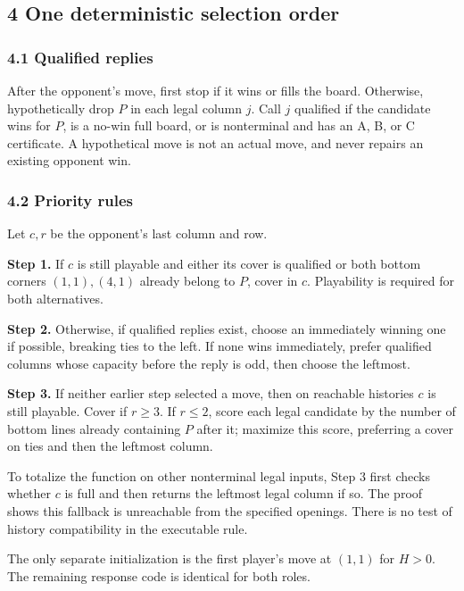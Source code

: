 \documentclass[
  a4paper,
]{article}
\newcounter{none} %
\begin{document}
\subsection{4 One deterministic selection
order}\label{one-deterministic-selection-order}

\subsubsection{4.1 Qualified replies}\label{qualified-replies}

After the opponent's move, first stop if it wins or fills the board.
Otherwise, hypothetically drop \(P\) in each legal column \(j\). Call
\(j\) qualified if the candidate wins for \(P\), is a no-win full board,
or is nonterminal and has an A, B, or C certificate. A hypothetical move
is not an actual move, and never repairs an existing opponent win.

\subsubsection{4.2 Priority rules}\label{priority-rules}

Let \(c,r\) be the opponent's last column and row.

\textbf{Step 1.} If \(c\) is still playable and either its cover is
qualified or both bottom corners \((1,1),(4,1)\) already belong to
\(P\), cover in \(c\). Playability is required for both alternatives.

\textbf{Step 2.} Otherwise, if qualified replies exist, choose an
immediately winning one if possible, breaking ties to the left. If none
wins immediately, prefer qualified columns whose capacity before the
reply is odd, then choose the leftmost.

\textbf{Step 3.} If neither earlier step selected a move, then on
reachable histories \(c\) is still playable. Cover if \(r\ge3\). If
\(r\le2\), score each legal candidate by the number of bottom lines
already containing \(P\) after it; maximize this score, preferring a
cover on ties and then the leftmost column.

To totalize the function on other nonterminal legal inputs, Step 3 first
checks whether \(c\) is full and then returns the leftmost legal column
if so. The proof shows this fallback is unreachable from the specified
openings. There is no test of history compatibility in the executable
rule.

The only separate initialization is the first player's move at \((1,1)\)
for \(H>0\). The remaining response code is identical for both roles.
\end{document}
